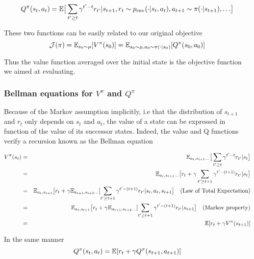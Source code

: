 \begin{equation}
    Q^\pi(s_t, a_t) = \mathbb{E} \big[ \sum_{t' \ge t} \gamma^{t'-t} r_{t'} | {s_{t+1}, r_t \sim p_{\text{env}}(\cdot | s_t, a_t), a_{t+1} \sim \pi(\cdot|s_{t+1}), \dots} \big] 
\end{equation}

These two functions can be easily related to our original objective
$${\mathcal{J}}(\pi) = \mathbb{E}_{s_0 \sim \mu} [ V^\pi(s_0)] = \mathbb{E}_{s_0 \sim \mu, a_0 \sim \pi(\cdot | s_0)} [ Q^\pi(s_0, a_0)]$$

Thus the value function averaged over the initial state is the objective function we aimed at evaluating.



\subsubsection{Bellman equations for $V^\pi$ and $Q^\pi$}
\label{subsec:bellman_eq}
Because of the Markov assumption implicitly, i.e that the distribution of $s_{t+1}$ and $r_t$ only depends on $s_t$ and $a_t$, the value of a state can be expressed in function of the value of its successor states. Indeed, the value and Q functions verify a recursion known as the Bellman equation

\begin{eqnarray}
    V^\pi(s_t) &=& \mathbb{E}_{a_t, s_{t+1} \dots} \big[ \sum_{t' \ge t} \gamma^{t'-t} r_{t'} | s_t \big] \nonumber\\
    &=&  \mathbb{E}_{a_t, s_{t+1} \dots} \big[ r_t + \gamma \sum_{t' \ge t+1} \gamma^{t'-(t+1)} r_{t'} | s_t \big]\nonumber\\
     &=&  \mathbb{E}_{a_t, s_{t+1}
} \big[ r_t + \gamma \mathbb{E}_{a_{t+1}, s_{t+2} \dots} [\sum_{t' \ge t+1} \gamma^{t'-(t+1)} r_{t'} | s_t, a_t, s_{t+1} \big] \quad \text{(Law of Total Expectation)}\nonumber\\
    &=&  \mathbb{E}_{a_t, s_{t+1}} \big[ r_t + \gamma \mathbb{E}_{a_{t+1}, s_{t+2} \dots} [\sum_{t' \ge t+1} \gamma^{t'-(t+1)} r_{t'} | s_{t+1} \big] \quad \text{(Markov property)}\nonumber\\
    &=& \mathbb{E} [r_t + \gamma V^\pi(s_{t+1})]
\end{eqnarray}


In the same manner
\begin{equation}
\label{eq:expected_bellman}
    Q^\pi(s_t, a_t) =  \mathbb{E} [r_t + \gamma Q^\pi(s_{t+1}, a_{t+1})]
\end{equation}

